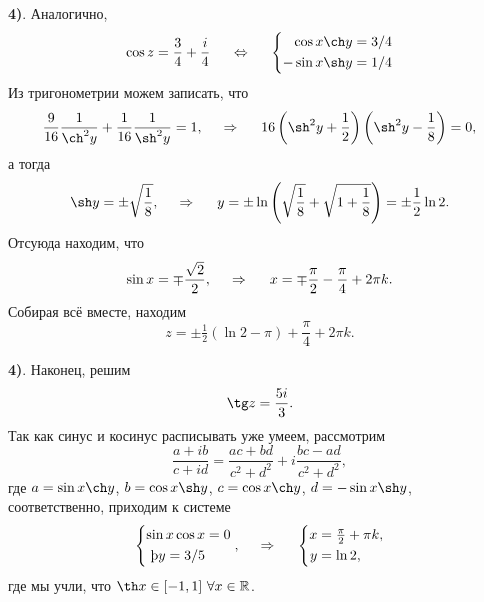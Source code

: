 \textbf{4)}. Аналогично,
\begin{equation*}
    \cos z = \frac{3}{4} + \frac{i}{4}
    \hspace{5 mm} \Leftrightarrow \hspace{5 mm} 
    \left\{\begin{aligned}
        \cos x \ch y &=  3/4 \\
        - \sin x \sh y &= 1/4        
    \end{aligned}\right.
\end{equation*}
Из тригонометрии можем записать, что
\begin{equation*}
    \frac{9}{16} \frac{1}{\ch^2 y} + \frac{1}{16} \frac{1}{\sh^2 y} =1,
    \hspace{0.5cm} \Rightarrow \hspace{0.5cm}
    16 \left(\sh^2 y + \frac{1}{2}\right) \left(\sh^2 y - \frac{1}{8}\right) = 0,
\end{equation*}
а тогда
\begin{equation*}
    \sh y = \pm \sqrt{\frac{1}{8}},
    \hspace{0.5cm} \Rightarrow \hspace{0.5cm}
    y = \pm \ln \left(\sqrt{\frac{1}{8}} +\sqrt{1 + \frac{1}{8}}\right) = \pm \frac{1}{2} \ln 2.
\end{equation*}
Отсуюда находим, что
\begin{equation*}
    \sin x = \mp \frac{\sqrt{2}}{2},
    \hspace{0.5cm} \Rightarrow \hspace{0.5cm}
    x = \mp \frac{\pi}{2} - \frac{\pi}{4} + 2 \pi k.
\end{equation*}
Собирая всё вместе, находим
\begin{equation*}
    z = \pm \tfrac{1}{2}\left(\ln 2 - \pi\right) + \frac{\pi}{4} + 2 \pi k.
\end{equation*}


\textbf{4)}. Наконец, решим
\begin{equation*}
    \tg z = \frac{5i}{3}.
\end{equation*}
Так как синус и косинус расписывать уже умеем, рассмотрим
\begin{equation*}
    \frac{a + i b}{c + i d} = 
    \frac{a c + b d}{c^2 + d^2} + i \frac{bc - ad}{c^2 + d^2},
\end{equation*}
где $a = \sin x \ch y$, $b = \cos x \sh y$, $c = \cos x \ch y$, $d = - \sin x \sh y$, соответственно, приходим к системе
\begin{equation*}
    \left\{\begin{aligned}
        \sin x  \cos x &= 0 \\
        \th y = 3/5
    \end{aligned}\right.,
    \hspace{0.5cm} \Rightarrow \hspace{0.5cm}   
    \left\{\begin{aligned}
        x &= \tfrac{\pi}{2} + \pi k, \\
        y &= \ln 2, \\
    \end{aligned}\right.
\end{equation*}
где мы учли, что $\th x \in [-1, 1] \ \forall x \in \mathbb{R}$. 


